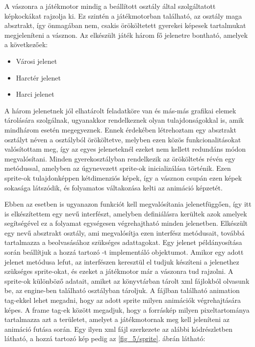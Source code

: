 A vászonra a játékmotor mindig a beállított  osztály által szolgáltatott képkockákat rajzolja ki. 
Ez szintén a játékmotorban található, az osztály maga absztrakt, így önmagában nem, csakis örököltetett gyerekei képesek tartalmukat megjeleníteni a vásznon. 
Az elkészült játék három fő jelenetre bontható, amelyek a következőek:

\begin{itemize}
	\item Városi jelenet 
	\item Harctér jelenet 
	\item Harci jelenet 
\end{itemize}

A három jelenetnek jól elhatárolt feladatköre van és más-más grafikai elemek tárolására szolgálnak, ugyanakkor rendelkeznek olyan tulajdonságokkal is, amik mindhárom esetén megegyeznek. 
Ennek érdekében létrehoztam egy absztrakt osztályt  néven a  osztályból örököltetve, melyben ezen közös funkcionalitásokat valósítottam meg, így az egyes jeleneteknél ezeket nem kellett redundáns módon megvalósítani. 
Minden gyerekosztályban rendelkezik az örököltetés révén egy  metódussal, amelyben az úgynevezett sprite-ok inicializálása történik. 
Ezen sprite-ok tulajdonképpen kétdimenziós képek, így a vásznon csupán ezen képek sokasága látszódik, és folyamatos váltakozása kelti az animáció képzetét. 

Ebben az esetben is ugyanazon funkciót kell megvalósítania jelenetfüggően, így itt is elkészítettem egy  nevű interfészt, amelyben definiálásra kerültek azok amelyek segítségével ez a folyamat egységesen végrehajtható minden jelenetben. 
Elkészült egy  nevű absztrakt osztály, ami megvalósítja ezen interfész metódusait, továbbá tartalmazza a beolvasásához szükséges adattagokat. 
Egy jelenet példányosítása során beállítjuk a hozzá tartozó -t implementáló objektumot. 
Amikor egy adott jelenet  metódusa lefut, az interfészen keresztül el tudjuk készíteni a jelenethez szükséges sprite-okat, és ezeket a játékmotor már a vászonra tud rajzolni. 
A sprite-ok különböző adatait, amiket az  könyvtárban tárolt xml fájlokból olvasunk be, az engine-ben található  osztályban tároljuk. 
A fájlban található animation tag-ekkel lehet megadni, hogy az adott sprite milyen animációk végrehajtására képes. 
A frame tag-ek között megadjuk, hogy a forráskép milyen pixeltartománya tartalmazza azt a területet, amelyet a játékmotornak meg kell jeleníteni az animáció futása során. 
Egy ilyen xml fájl szerkezete az alábbi kódrészletben látható, a hozzá tartozó kép pedig az \ref{fig_5/sprite}. ábrán látható:

